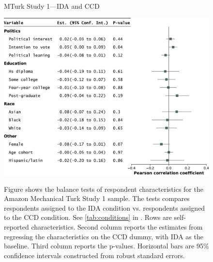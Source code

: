 \begin{center}
	\begin{figure}
		\centering
		\caption{MTurk Study 1---IDA and CCD}
		\includegraphics[width=\textwidth]{../figs/study1-baltest-24k-ips.pdf}
		\label{fig:baltest-24k-ips}
		\caption*{\footnotesize 
			Figure shows the balance tests of respondent characteristics for the Amazon Mechanical Turk Study 1 sample.
			The tests compares respondents assigned to the IDA condition vs. respondents assigned to the CCD condition.
			See \cref{tab:conditions} in .
			Rows are self-reported characteristics.
			Second column reports the estimates from regressing the characteristics on the CCD dummy, with IDA as the baseline.
			Third column reports the p-values.
			Horizontal bars are 95\% confidence intervals constructed from robust standard errors.
		}
	\end{figure}
\end{center}


